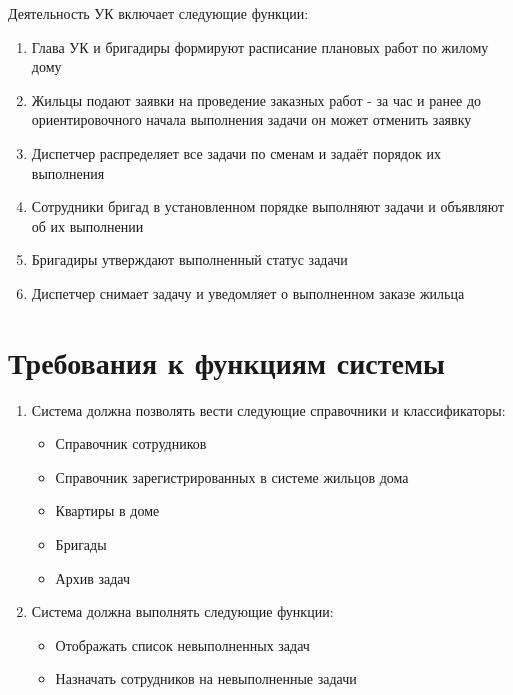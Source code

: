 Деятельность УК включает следующие функции:
\begin{enumerate}
\item Глава УК и бригадиры формируют расписание плановых работ по жилому дому
\item Жильцы подают заявки на проведение заказных работ - за час и ранее до ориентировочного начала выполнения задачи он может отменить заявку
\item Диспетчер распределяет все задачи по сменам и задаёт порядок их выполнения 
\item Сотрудники бригад в установленном порядке выполняют задачи и объявляют об их выполнении
\item Бригадиры утверждают выполненный статус задачи
\item Диспетчер снимает задачу и уведомляет о выполненном заказе жильца
\end{enumerate}

\section{Требования к функциям системы}

\begin{enumerate}
\item Система должна позволять вести следующие справочники и классификаторы:
\begin{itemize}
\item Справочник сотрудников
\item Справочник зарегистрированных в системе жильцов дома
\item Квартиры в доме
\item Бригады
\item Архив задач
\end{itemize}
\item Система должна выполнять следующие функции:
\begin{itemize}
\item Отображать список невыполненных задач
\item Назначать сотрудников на невыполненные задачи 
\end{itemize}
\end{enumerate}






